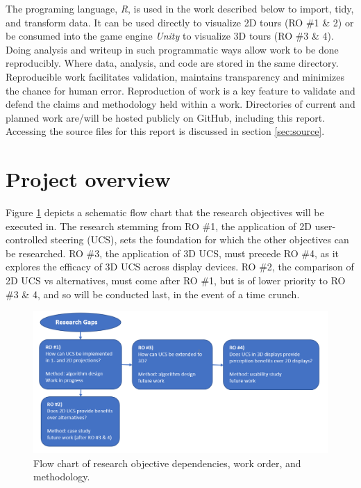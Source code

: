 \documentclass{monashthesis}
\begin{document}
The programing language, \emph{R}, is used in the work described below
to import, tidy, and transform data. It can be used directly to
visualize 2D tours (RO \#1 \& 2) or be consumed into the game engine
\emph{Unity} to visualize 3D tours (RO \#3 \& 4). Doing analysis and
writeup in such programmatic ways allow work to be done reproducibly.
Where data, analysis, and code are stored in the same directory.
Reproducible work facilitates validation, maintains transparency and
minimizes the chance for human error. Reproduction of work is a key
feature to validate and defend the claims and methodology held within a
work. Directories of current and planned work are/will be hosted
publicly on GitHub, including this report. Accessing the source files
for this report is discussed in section \ref{sec:source}.

\section{Project overview}\label{ch:projectoverview}

Figure \ref{fig:ProjectOverview} depicts a schematic flow chart that the
research objectives will be executed in. The research stemming from RO
\#1, the application of 2D user-controlled steering (UCS), sets the
foundation for which the other objectives can be researched. RO \#3, the
application of 3D UCS, must precede RO \#4, as it explores the efficacy
of 3D UCS across display devices. RO \#2, the comparison of 2D UCS vs
alternatives, must come after RO \#1, but is of lower priority to RO \#3
\& 4, and so will be conducted last, in the event of a time crunch.




\begin{figure}

{\centering \includegraphics[width=1\linewidth]{./figures/ProjectOverview} 

}

\caption{Flow chart of research objective dependencies,
work order, and methodology.}\label{fig:ProjectOverview}
\end{figure}
\end{document}
